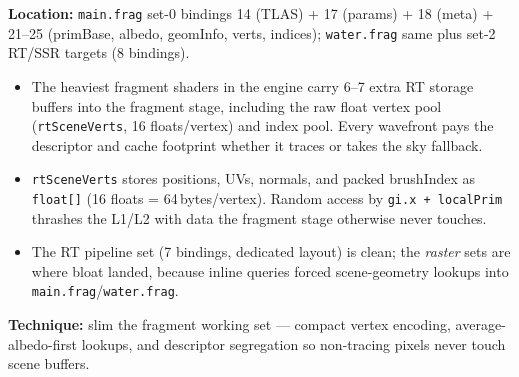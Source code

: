 \documentclass[11pt,a4paper]{article}
\begin{document}
\textbf{Location:} \texttt{main.frag} set-0 bindings 14 (TLAS) + 17 (params) + 18 (meta) + 21--25 (primBase, albedo, geomInfo, verts, indices); \texttt{water.frag} same plus set-2 RT/SSR targets (8 bindings).

\begin{itemize}
    \item The heaviest fragment shaders in the engine carry 6--7 extra RT storage buffers into the fragment stage, including the raw float vertex pool (\texttt{rtSceneVerts}, 16 floats/vertex) and index pool. Every wavefront pays the descriptor and cache footprint whether it traces or takes the sky fallback.
    \item \texttt{rtSceneVerts} stores positions, UVs, normals, and packed brushIndex as \texttt{float[]} (16 floats = 64\,bytes/vertex). Random access by \texttt{gi.x + localPrim} thrashes the L1/L2 with data the fragment stage otherwise never touches.
    \item The RT pipeline set (7 bindings, dedicated layout) is clean; the \textit{raster} sets are where bloat landed, because inline queries forced scene-geometry lookups into \texttt{main.frag}/\texttt{water.frag}.
\end{itemize}

\textbf{Technique:} slim the fragment working set --- compact vertex encoding, average-albedo-first lookups, and descriptor segregation so non-tracing pixels never touch scene buffers.
\end{document}
